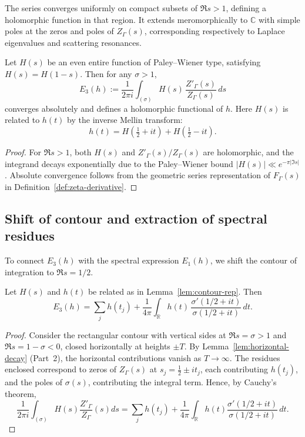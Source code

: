 \begin{remark}
The series converges uniformly on compact subsets of $\Re s>1$, defining a holomorphic function in that region.  
It extends meromorphically to $\mathbb{C}$ with simple poles at the zeros and poles of $Z_\Gamma(s)$, corresponding respectively to Laplace eigenvalues and scattering resonances.
\end{remark}

\begin{lemma}
\label{lem:contour-rep}
Let $H(s)$ be an even entire function of Paley–Wiener type, satisfying $H(s)=H(1-s)$.  
Then for any $\sigma>1$,
\[
E_3(h) := \frac{1}{2\pi i}
\int_{(\sigma)} H(s)\, \frac{Z'_\Gamma(s)}{Z_\Gamma(s)}\,ds
\]
converges absolutely and defines a holomorphic functional of $h$.  
Here $H(s)$ is related to $h(t)$ by the inverse Mellin transform:
\[
h(t)=H(\tfrac{1}{2}+it)+H(\tfrac{1}{2}-it).
\]
\end{lemma}

\begin{proof}\relax
For $\Re s>1$, both $H(s)$ and $Z'_\Gamma(s)/Z_\Gamma(s)$ are holomorphic, and the integrand decays exponentially due to the Paley–Wiener bound $|H(s)|\ll e^{-\pi|\Im s|}$.  
Absolute convergence follows from the geometric series representation of $F_\Gamma(s)$ in Definition~\ref{def:zeta-derivative}.
\end{proof}

\subsection{Shift of contour and extraction of spectral residues}
\label{subsec:ch4-part4-contourshift}
\relax

To connect $E_3(h)$ with the spectral expression $E_1(h)$, we shift the contour of integration to $\Re s=1/2$.

\begin{theorem}
\label{thm:contour-shift}
Let $H(s)$ and $h(t)$ be related as in Lemma~\ref{lem:contour-rep}.  
Then
\[
E_3(h)
= \sum_j h(t_j)
+ \frac{1}{4\pi}\int_{\mathbb{R}} h(t)\,\frac{\sigma'(1/2+it)}{\sigma(1/2+it)}\,dt.
\]
\end{theorem}

\begin{proof}\relax
Consider the rectangular contour with vertical sides at $\Re s=\sigma>1$ and $\Re s=1-\sigma<0$, closed horizontally at heights $\pm T$.  
By Lemma~\ref{lem:horizontal-decay} (Part~2), the horizontal contributions vanish as $T\to\infty$.  
The residues enclosed correspond to zeros of $Z_\Gamma(s)$ at $s_j=\tfrac{1}{2}\pm it_j$, each contributing $h(t_j)$, and the poles of $\sigma(s)$, contributing the integral term.  
Hence, by Cauchy’s theorem,
\[
\frac{1}{2\pi i}\int_{(\sigma)} H(s)\frac{Z'_\Gamma}{Z_\Gamma}(s)ds
= \sum_j h(t_j) + \frac{1}{4\pi}\int_{\mathbb{R}} h(t)\frac{\sigma'(1/2+it)}{\sigma(1/2+it)}\,dt.
\]
\end{proof}

